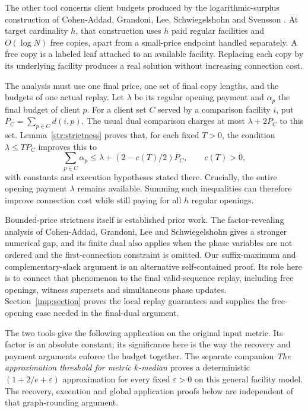 The other tool concerns client budgets produced by the logarithmic-surplus
construction of Cohen-Addad, Grandoni, Lee, Schwiegelshohn and Svensson
\cite{CGLSS2026}.  At target cardinality $h$, that construction uses
$h$ paid regular facilities and $O(\log N)$ free copies, apart from a
small-price endpoint handled separately.  A free copy is a labeled leaf
attached to an available facility.  Replacing each copy by its underlying
facility produces a real solution without increasing connection cost.

The analysis must use one final price, one set of final copy lengths,
and the budgets of one actual replay.  Let $\lambda$ be its regular
opening payment and $\alpha_p$ the final budget of client $p$.
For a client set $C$ served by a comparison facility $i$, put
$P_C=\sum_{p\in C}d(i,p)$.  The usual dual comparison charges at most
$\lambda+2P_C$ to this set.  Lemma~\ref{str:strictness} proves that,
for each fixed $T>0$, the condition $\lambda\le TP_C$ improves this to
\[
 \sum_{p\in C}\alpha_p
 \le \lambda+(2-c(T)/2)P_C,
 \qquad c(T)>0,
\]
with constants and execution hypotheses stated there.  Crucially, the
entire opening payment $\lambda$ remains available.  Summing such
inequalities can therefore improve connection cost while still paying
for all $h$ regular openings.

Bounded-price strictness itself is established prior work.  The
factor-revealing analysis of Cohen-Addad, Grandoni, Lee and
Schwiegelshohn \cite[Appendix~B]{CGLS2026} gives a stronger numerical
gap, and its finite dual also applies when the phase variables are not
ordered and the first-connection constraint is omitted.  Our
suffix-maximum and complementary-slack argument is an alternative
self-contained proof.  Its role here is to connect that phenomenon to
the final valid-sequence replay, including free openings, witness
supersets and simultaneous phase updates.  Section~\ref{imp:section}
proves the local replay guarantees and supplies the free-opening case
needed in the final-dual argument.

The two tools give the following application on the original input
metric.  Its factor is an absolute constant; its significance here is
the way the recovery and payment arguments enforce the budget together.
The separate companion \emph{The approximation threshold for metric
$k$-median} \cite[Theorem~1.1]{OpenAIThreshold2026} proves a deterministic
$(1+2/e+\varepsilon)$ approximation for every fixed $\varepsilon>0$
on this general facility model.  The recovery, execution and global
application proofs below are independent of that graph-rounding argument.

